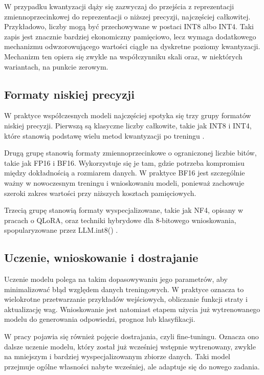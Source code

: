 W przypadku kwantyzacji dąży się zazwyczaj do przejścia z reprezentacji zmiennoprzecinkowej do reprezentacji o niższej precyzji, najczęściej całkowitej. Przykładowo, liczby mogą być przechowywane w postaci INT8 albo INT4. Taki zapis jest znacznie bardziej ekonomiczny pamięciowo, lecz wymaga dodatkowego mechanizmu odwzorowującego wartości ciągłe na dyskretne poziomy kwantyzacji. Mechanizm ten opiera się zwykle na współczynniku skali oraz, w niektórych wariantach, na punkcie zerowym.

\subsection{Formaty niskiej precyzji}

W praktyce współczesnych modeli najczęściej spotyka się trzy grupy formatów niskiej precyzji. Pierwszą są klasyczne liczby całkowite, takie jak INT8 i INT4, które stanowią podstawę wielu metod kwantyzacji po treningu \cite{jacob2017quantization,dettmers2023case4bit}.

Drugą grupę stanowią formaty zmiennoprzecinkowe o ograniczonej liczbie bitów, takie jak FP16 i BF16. Wykorzystuje się je tam, gdzie potrzeba kompromisu między dokładnością a rozmiarem danych. W praktyce BF16 jest szczególnie ważny w nowoczesnym treningu i wnioskowaniu modeli, ponieważ zachowuje szeroki zakres wartości przy niższych kosztach pamięciowych.

Trzecią grupę stanowią formaty wyspecjalizowane, takie jak NF4, opisany w pracach o QLoRA, oraz techniki hybrydowe dla 8-bitowego wnioskowania, spopularyzowane przez LLM.int8() \cite{dettmers2023qlora,dettmers2022llmint8}.

\subsection{Uczenie, wnioskowanie i dostrajanie}

Uczenie modelu polega na takim dopasowywaniu jego parametrów, aby minimalizować błąd względem danych treningowych. W praktyce oznacza to wielokrotne przetwarzanie przykładów wejściowych, obliczanie funkcji straty i aktualizację wag. Wnioskowanie jest natomiast etapem użycia już wytrenowanego modelu do generowania odpowiedzi, prognoz lub klasyfikacji.

W pracy pojawia się również pojęcie dostrajania, czyli fine-tuningu. Oznacza ono dalsze uczenie modelu, który został już wcześniej wstępnie wytrenowany, zwykle na mniejszym i bardziej wyspecjalizowanym zbiorze danych. Taki model przejmuje ogólne własności nabyte wcześniej, ale adaptuje się do nowego zadania.


